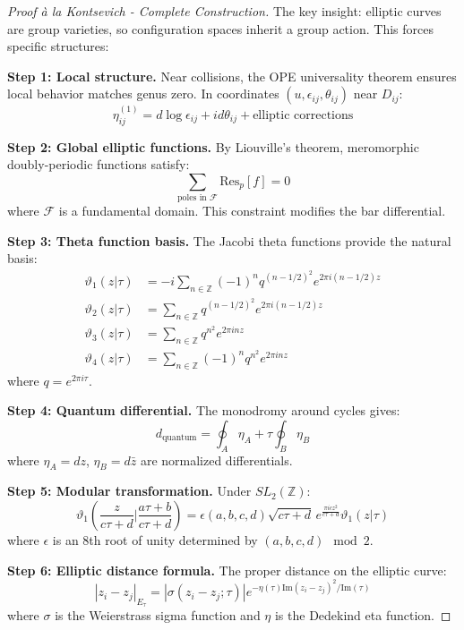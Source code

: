 \begin{proof}[Proof à la Kontsevich - Complete Construction]
The key insight: elliptic curves are group varieties, so configuration spaces inherit a group action. This forces specific structures:

\textbf{Step 1: Local structure.} Near collisions, the OPE universality theorem ensures local behavior matches genus zero. In coordinates $(u, \epsilon_{ij}, \theta_{ij})$ near $D_{ij}$:
$$\eta_{ij}^{(1)} = d\log\epsilon_{ij} + id\theta_{ij} + \text{elliptic corrections}$$

\textbf{Step 2: Global elliptic functions.} By Liouville's theorem, meromorphic doubly-periodic functions satisfy:
$$\sum_{\text{poles in } \mathcal{F}} \text{Res}_p[f] = 0$$
where $\mathcal{F}$ is a fundamental domain. This constraint modifies the bar differential.

\textbf{Step 3: Theta function basis.} The Jacobi theta functions provide the natural basis:
\begin{align}
\vartheta_1(z|\tau) &= -i\sum_{n \in \mathbb{Z}}(-1)^n q^{(n-1/2)^2} e^{2\pi i(n-1/2)z} \\
\vartheta_2(z|\tau) &= \sum_{n \in \mathbb{Z}} q^{(n-1/2)^2} e^{2\pi i(n-1/2)z} \\
\vartheta_3(z|\tau) &= \sum_{n \in \mathbb{Z}} q^{n^2} e^{2\pi inz} \\
\vartheta_4(z|\tau) &= \sum_{n \in \mathbb{Z}}(-1)^n q^{n^2} e^{2\pi inz}
\end{align}
where $q = e^{2\pi i\tau}$.

\textbf{Step 4: Quantum differential.} The monodromy around cycles gives:
$$d_{\text{quantum}} = \oint_A \eta_A + \tau \oint_B \eta_B$$
where $\eta_A = dz$, $\eta_B = d\bar{z}$ are normalized differentials.

\textbf{Step 5: Modular transformation.} Under $SL_2(\mathbb{Z})$:
$$\vartheta_1\left(\frac{z}{c\tau+d}\bigg|\frac{a\tau+b}{c\tau+d}\right) = \epsilon(a,b,c,d)\sqrt{c\tau+d}\,e^{\frac{\pi i cz^2}{c\tau+d}}\vartheta_1(z|\tau)$$
where $\epsilon$ is an 8th root of unity determined by $(a,b,c,d) \mod 2$.

\textbf{Step 6: Elliptic distance formula.} The proper distance on the elliptic curve:
$$|z_i - z_j|_{E_\tau} = |\sigma(z_i - z_j; \tau)|e^{-\eta(\tau)\text{Im}(z_i - z_j)^2/\text{Im}(\tau)}$$
where $\sigma$ is the Weierstrass sigma function and $\eta$ is the Dedekind eta function.
\end{proof}

